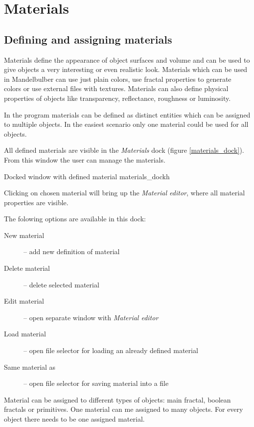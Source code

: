 \section{Materials}\label{materials}

\subsection{Defining and assigning materials}\label{defining-materials}

Materials define the appearance of object surfaces and volume and can be used to give objects a very interesting or even realistic look. Materials which can be used in Mandelbulber can use just plain colors, use fractal properties to generate colors or use external files with textures. Materials can also define physical properties of objects like transparency, reflectance, roughness or luminosity. 

In the program materials can be defined as distinct entities which can be assigned to multiple objects. In the easiest scenario only one material could be used for all objects.

All defined materials are visible in the \emph{Materials} dock (figure \ref{materials_dock}).
From this window the user can manage the materials.

{Docked window with defined material}
{materials_dock}{h}

Clicking on chosen material will bring up the \emph{Material editor}, where all material properties are visible.

The folowing options are available in this dock:

\begin{description}
		\item[New material] -- add new definition of material
		\item[Delete material] -- delete selected material
		\item[Edit material] -- open separate window with \emph{Material editor}
		\item[Load material] -- open file selector for loading an already defined material
		\item[Same material as] -- open file selector for saving material into a file
\end{description}

Material can be assigned to different types of objects: main fractal, boolean fractals or primitives. One material can me assigned to many objects. For every object there needs to be one assigned material.

